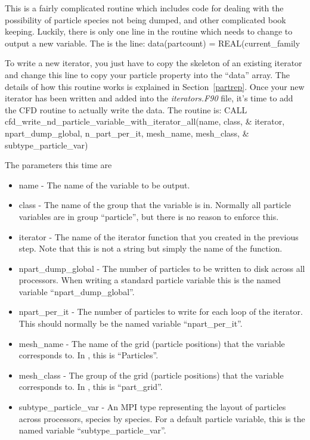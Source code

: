 \documentclass[12pt,a4paper]{article}
\newcommand{\EPOCH}{{\color{warwickdark}\fontfamily{phv}\selectfont{EPOCH}}}
\newenvironment{boxverbatim}{\lboxverbatim{none}}{\endlboxverbatim}
\begin{document}
This is a fairly complicated routine which includes code for dealing with the
possibility of particle species not being dumped, and other complicated
book keeping. Luckily, there is only one line in the routine which needs to
change to output a new variable. The is the line:
\begin{boxverbatim}
  data(partcount) = REAL(current_family%
\end{boxverbatim}

To write a new iterator, you just have to copy the skeleton of an existing
iterator and change this line to copy your particle property into the ``data''
array. The details of how this routine works is explained in
Section~\ref{partrep}. Once your new iterator has been written and added into
the {\it iterators.F90} file, it's time to add the CFD routine to actually
write the data. The routine is:
\begin{boxverbatim}
CALL cfd_write_nd_particle_variable_with_iterator_all(name, class, &
    iterator, npart_dump_global, n_part_per_it, mesh_name, mesh_class, &
    subtype_particle_var)
\end{boxverbatim}

The parameters this time are
\begin{itemize}
\item name - The name of the variable to be output.
\item class - The name of the group that the variable is in. Normally all
  {\EPOCH} particle variables are in group ``particle'', but there is no reason
  to enforce this.
\item iterator - The name of the iterator function that you created in
  the previous step. Note that this is not a string but simply the name of the
  function.
\item npart\_dump\_global - The number of particles to be written to disk
  across all processors. When writing a standard particle variable this is the
  named variable ``npart\_dump\_global''.
\item npart\_per\_it - The number of particles to write for each loop of the
  iterator. This should normally be the named variable ``npart\_per\_it''.
\item mesh\_name - The name of the grid (particle positions) that the variable
  corresponds to. In {\EPOCH}, this is ``Particles''.
\item mesh\_class - The group of the grid (particle positions) that the variable
  corresponds to. In {\EPOCH}, this is ``part\_grid''.
\item subtype\_particle\_var - An MPI type representing the layout of particles
  across processors, species by species. For a default particle variable, this
  is the named variable ``subtype\_particle\_var''.
\end{itemize}
\end{document}
